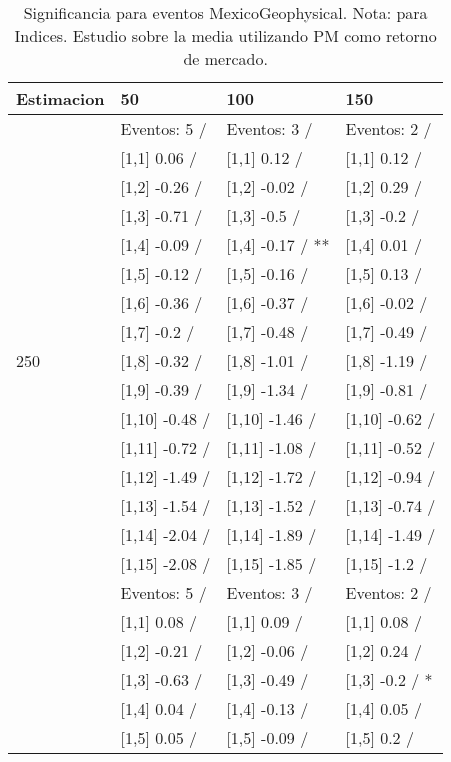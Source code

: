 \begin{table}

\caption{Significancia para eventos MexicoGeophysical. Nota: para Indices. Estudio sobre la media utilizando PM como retorno de mercado.}
\centering
\begin{tabular}[t]{llll}
\toprule
Estimacion & 50 & 100 & 150\\
\midrule
 & Eventos:  5 / & Eventos:  3 / & Eventos:  2 /\\
 & {}[1,1] 0.06  / & {}[1,1] 0.12  / & {}[1,1] 0.12  /\\
 & {}[1,2] -0.26  / & {}[1,2] -0.02  / & {}[1,2] 0.29  /\\
 & {}[1,3] -0.71  / & {}[1,3] -0.5  / & {}[1,3] -0.2  /\\
 & {}[1,4] -0.09  / & {}[1,4] -0.17  / ** & {}[1,4] 0.01  /\\
\addlinespace
 & {}[1,5] -0.12  / & {}[1,5] -0.16  / & {}[1,5] 0.13  /\\
 & {}[1,6] -0.36  / & {}[1,6] -0.37  / & {}[1,6] -0.02  /\\
 & {}[1,7] -0.2  / & {}[1,7] -0.48  / & {}[1,7] -0.49  /\\
250 & {}[1,8] -0.32  / & {}[1,8] -1.01  / & {}[1,8] -1.19  /\\
 & {}[1,9] -0.39  / & {}[1,9] -1.34  / & {}[1,9] -0.81  /\\
\addlinespace
 & {}[1,10] -0.48  / & {}[1,10] -1.46  / & {}[1,10] -0.62  /\\
 & {}[1,11] -0.72  / & {}[1,11] -1.08  / & {}[1,11] -0.52  /\\
 & {}[1,12] -1.49  / & {}[1,12] -1.72  / & {}[1,12] -0.94  /\\
 & {}[1,13] -1.54  / & {}[1,13] -1.52  / & {}[1,13] -0.74  /\\
 & {}[1,14] -2.04  / & {}[1,14] -1.89  / & {}[1,14] -1.49  /\\
\addlinespace
 & {}[1,15] -2.08  / & {}[1,15] -1.85  / & {}[1,15] -1.2  /\\
 & Eventos:  5 / & Eventos:  3 / & Eventos:  2 /\\
 & {}[1,1] 0.08  / & {}[1,1] 0.09  / & {}[1,1] 0.08  /\\
 & {}[1,2] -0.21  / & {}[1,2] -0.06  / & {}[1,2] 0.24  /\\
 & {}[1,3] -0.63  / & {}[1,3] -0.49  / & {}[1,3] -0.2  / *\\
\addlinespace
 & {}[1,4] 0.04  / & {}[1,4] -0.13  / & {}[1,4] 0.05  /\\
 & {}[1,5] 0.05  / & {}[1,5] -0.09  / & {}[1,5] 0.2  /\\

\end{tabular}
\end{table}
